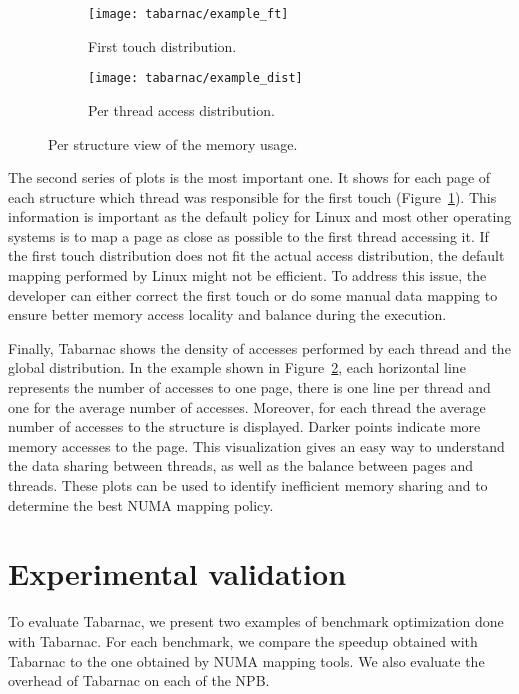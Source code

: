 \begin{figure}[htb]
    \centering
    \begin{subfigure}{.49\linewidth}
        \texttt{[image: tabarnac/example\_ft]}
        \caption{First touch distribution.}
        \label{fig:example_ft}
    \end{subfigure}
    \begin{subfigure}{.49\linewidth}
        \texttt{[image: tabarnac/example\_dist]}
        \caption{Per thread access distribution.}
        \label{fig:example_dist}
    \end{subfigure}
    \caption{Per structure view of the memory usage.}
    \label{fig:example_by_structs}
\end{figure}

The second series of plots is the most important one.
It shows for each page of each structure which thread was responsible for the first touch (Figure~\ref{fig:example_ft}).
This information is important as the default policy for \gls{Linux} and most other operating systems is to map a page as close as possible to the first thread accessing it.
If the first touch distribution does not fit the actual access distribution, the default mapping performed by \gls{Linux} might not be efficient.
To address this issue, the developer can either correct the first touch or do some manual data mapping to ensure better memory access locality and balance during the execution.

Finally, \gls{Tabarnac} shows the density of accesses performed by each thread and the global distribution.
In the example shown in Figure~\ref{fig:example_dist}, each horizontal line represents the number of accesses to one page, there is one line per thread and one for the average number of accesses.
Moreover, for each thread the average number of accesses to the structure is displayed.
Darker points indicate more memory accesses to the page. This visualization gives an easy way to understand the data sharing between threads, as well as the balance between pages and
threads.
These plots can be used to identify inefficient memory sharing and to determine the best \gls{NUMA} mapping policy.

\section{Experimental validation}
\label{sec:tab-expe}

To evaluate \gls{Tabarnac}, we present two examples of benchmark optimization done with \gls{Tabarnac}.
For each benchmark, we compare the speedup obtained with \gls{Tabarnac} to the one obtained by \gls{NUMA} mapping tools.
We also evaluate the overhead of \gls{Tabarnac} on each of the \gls{NPB}.

